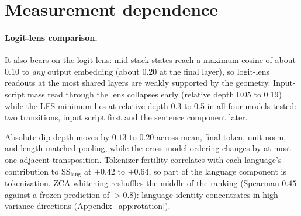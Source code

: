 \documentclass{article} %
\newcommand{\SSl}{\mathrm{SS}_{\mathrm{lang}}}
\begin{document}
\begin{table}[h]\caption{Base versus instruction-tuned checkpoints on the 128-language, 300-sentence NTREX grid, direct-SS LFS.}\label{tab:instruct}
\begin{center}\scriptsize
{}
\end{center}

\end{table}

\section{Measurement dependence}
\label{app:measdep}
\paragraph{Logit-lens comparison.} It also bears on the logit lens: mid-stack states reach a maximum cosine of about $0.10$ to \emph{any} output embedding (about $0.20$ at the final layer), so logit-lens readouts at the most shared layers are weakly supported by the geometry. Input-script mass read through the lens collapses early (relative depth 0.05 to 0.19) while the LFS minimum lies at relative depth 0.3 to 0.5 in all four models tested: two transitions, input script first and the sentence component later.

Absolute dip depth moves by $0.13$ to $0.20$ across mean, final-token, unit-norm, and length-matched pooling, while the cross-model ordering changes by at most one adjacent transposition. Tokenizer fertility correlates with each language's contribution to $\SSl$ at $+0.42$ to $+0.64$, so part of the language component is tokenization. ZCA whitening reshuffles the middle of the ranking (Spearman $0.45$ against a frozen prediction of $>0.8$): language identity concentrates in high-variance directions (Appendix~\ref{app:rotation}).
\end{document}
